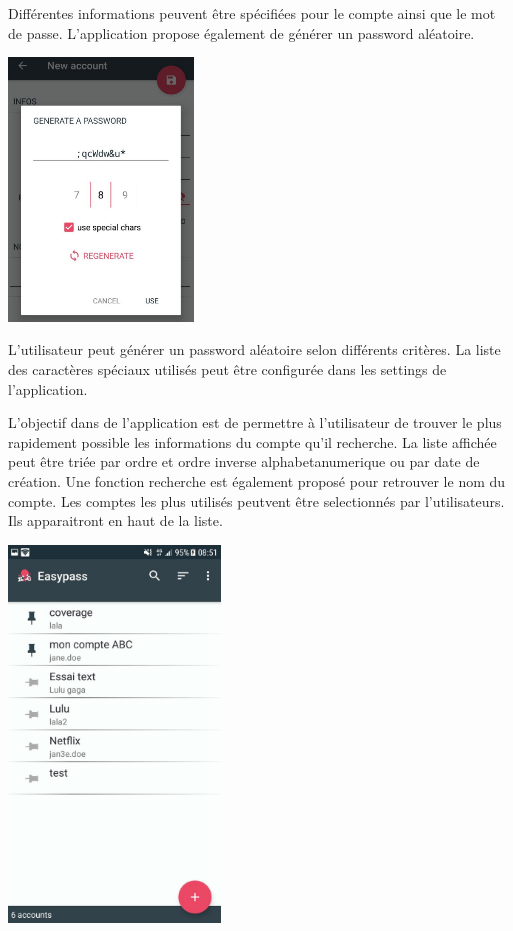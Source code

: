 Différentes informations peuvent être spécifiées pour le compte ainsi que le mot de passe. L'application \easypass{} propose également de générer un password aléatoire.

\includegraphics[height=7cm]{generate_password.jpg}

L'utilisateur peut générer un password aléatoire selon différents critères. La liste des caractères spéciaux utilisés peut être configurée dans les settings de l'application.

 L'objectif dans de l'application \easypass{} est de permettre à l'utilisateur de trouver le plus rapidement possible les informations du compte qu'il recherche. La liste affichée peut être triée par ordre et ordre inverse alphabetanumerique ou par date de création. Une fonction recherche est également proposé pour retrouver le nom du compte. Les comptes les plus utilisés peutvent être selectionnés par l'utilisateurs. Ils apparaitront en haut de la liste. 

\includegraphics[height=10cm]{liste.jpg}

